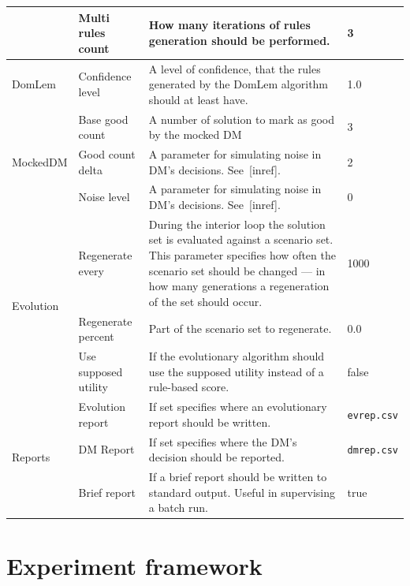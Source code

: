 \begin{table}
\begin{tabular}{l l p{7cm} l}
    & Multi rules count & How many iterations of rules generation should be performed. & 3 \\
    \hline
    DomLem & Confidence level & A level of confidence, that the rules generated by the
    DomLem algorithm should at least have. & 1.0 \\
    \hline
    \multirow{3}{*}{MockedDM} & Base good count & A number of solution to mark
    as good by the mocked DM& 3 \\
    & Good count delta & A parameter for simulating noise in DM's decisions. See~[inref]. & 2 \\
    & Noise level & A parameter for simulating noise in DM's decisions. See~[inref]. & 0 \\
    \hline
    \multirow{3}{*}{Evolution} & Regenerate every & During the interior loop
    the solution set is evaluated against a scenario set. This parameter
    specifies how often the scenario set should be changed --- in how many
    generations a regeneration of the set should occur. & 1000 \\
    & Regenerate percent & Part of the scenario set to regenerate. & 0.0 \\
    & Use supposed utility & If the evolutionary algorithm should use the
    supposed utility instead of a rule-based score. & false \\
  \hline
  \multirow{3}{*}{Reports} & Evolution report & If set specifies where an
  evolutionary report should be written.  & \texttt{evrep.csv} \\
  & DM Report & If set specifies where the DM's decision should be reported. & \texttt{dmrep.csv} \\
  &  Brief report & If a brief report should be written to standard
  output. Useful in supervising a batch run. & true \\
  \hline
  \end{tabular}
\end{table}



\section{Experiment framework}

